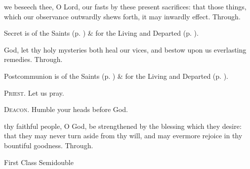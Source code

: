 \secret
{} we beseech thee, O Lord, our fasts by these present sacrifices: that those things, which our observance outwardly shews forth, it may inwardly effect. Through.
\begin{rubric}
     Secret is of the Saints (p. \pageref{SPSaints}) \&  for the Living and Departed (p. \pageref{SPLivingDeparted}).
\end{rubric}
\postcommunion
{} God, let thy holy mysteries both heal our vices, and bestow upon us everlasting remedies. Through.
\begin{rubric}
     Postcommunion is of the Saints (p. \pageref{SPSaints}) \&  for the Living and Departed (p. \pageref{SPLivingDeparted}).
\end{rubric}

\textsc{Priest.} Let us pray.\par
\textsc{Deacon.} Humble your heads before God.\par
{} thy faithful people, O God, be strengthened by the blessing which they desire: that they may never turn aside from thy will, and may evermore rejoice in thy bountiful goodness. Through.

\begin{inhead}
{First Class Semidouble}
\end{inhead}
\fancyhead[RE,LO]{}

\properantiphonfix

